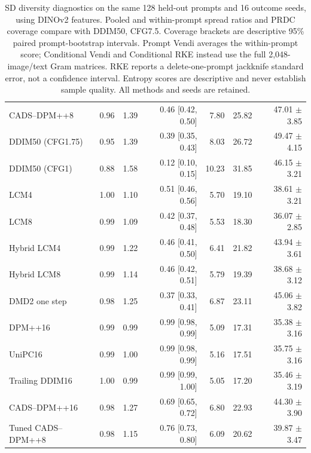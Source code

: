 \begin{table}[t]
\begin{tabular}{lrrrrrr}
CADS--DPM++8 & 0.96 & 1.39 & 0.46 [0.42, 0.50] & 7.80 & 25.82 & 47.01 $\pm$ 3.85 \\
DDIM50 (CFG1.75) & 0.95 & 1.39 & 0.39 [0.35, 0.43] & 8.03 & 26.72 & 49.47 $\pm$ 4.15 \\
DDIM50 (CFG1) & 0.88 & 1.58 & 0.12 [0.10, 0.15] & 10.23 & 31.85 & 46.15 $\pm$ 3.21 \\
LCM4 & 1.00 & 1.10 & 0.51 [0.46, 0.56] & 5.70 & 19.10 & 38.61 $\pm$ 3.21 \\
LCM8 & 0.99 & 1.09 & 0.42 [0.37, 0.48] & 5.53 & 18.30 & 36.07 $\pm$ 2.85 \\
Hybrid LCM4 & 0.99 & 1.22 & 0.46 [0.41, 0.50] & 6.41 & 21.82 & 43.94 $\pm$ 3.61 \\
Hybrid LCM8 & 0.99 & 1.14 & 0.46 [0.42, 0.51] & 5.79 & 19.39 & 38.68 $\pm$ 3.12 \\
DMD2 one step & 0.98 & 1.25 & 0.37 [0.33, 0.41] & 6.87 & 23.11 & 45.06 $\pm$ 3.82 \\
DPM++16 & 0.99 & 0.99 & 0.99 [0.98, 0.99] & 5.09 & 17.31 & 35.38 $\pm$ 3.16 \\
UniPC16 & 0.99 & 1.00 & 0.99 [0.98, 0.99] & 5.16 & 17.51 & 35.75 $\pm$ 3.16 \\
Trailing DDIM16 & 1.00 & 0.99 & 0.99 [0.99, 1.00] & 5.05 & 17.20 & 35.46 $\pm$ 3.19 \\
CADS--DPM++16 & 0.98 & 1.27 & 0.69 [0.65, 0.72] & 6.80 & 22.93 & 44.30 $\pm$ 3.90 \\
Tuned CADS--DPM++8 & 0.98 & 1.15 & 0.76 [0.73, 0.80] & 6.09 & 20.62 & 39.87 $\pm$ 3.47 \\
\bottomrule
\end{tabular}
\caption{SD diversity diagnostics on the same 128 held-out prompts and 16 outcome seeds, using DINOv2 features. Pooled and within-prompt spread ratios and PRDC coverage compare with DDIM50, CFG7.5. Coverage brackets are descriptive 95\% paired prompt-bootstrap intervals. Prompt Vendi averages the within-prompt score; Conditional Vendi and Conditional RKE instead use the full 2,048-image/text Gram matrices. RKE reports a delete-one-prompt jackknife standard error, not a confidence interval. Entropy scores are descriptive and never establish sample quality. All methods and seeds are retained.}
\label{tab:test_competing_diagnostics}
\end{table}

